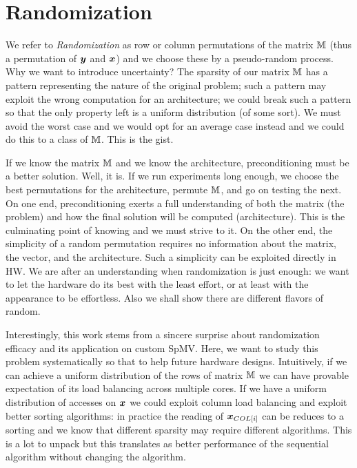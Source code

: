 \documentclass[manuscript,screen]{acmart}
\begin{document}
\section{Randomization}
\label{sec:randomization}
We refer to {\em Randomization} as row or column permutations of the
matrix $\mathbb{M}$ (thus a permutation of ${\boldsymbol y}$ and ${\boldsymbol x}$) and we choose
these by a pseudo-random process. Why we want to introduce
uncertainty? The sparsity of our matrix $\mathbb{M}$ has a pattern
representing the nature of the original problem; such a pattern may
exploit the wrong computation for an architecture; we could break such
a pattern so that the only property left is a uniform distribution (of
some sort). We must avoid the worst case and we would opt for an
average case instead and we could do this to a class of $\mathbb{M}$. This is
the gist.

If we know the matrix $\mathbb{M}$ and we know the architecture,
preconditioning must be a better solution.  Well, it is. If we run
experiments long enough, we choose the best permutations for the
architecture, permute $\mathbb{M}$, and go on testing the next.  On one end,
preconditioning exerts a full understanding of both the matrix (the
problem) and how the final solution will be computed
(architecture). This is the culminating point of knowing and we must
strive to it. On the other end, the simplicity of a random permutation
requires no information about the matrix, the vector, and the
architecture. Such a simplicity can be exploited directly in HW. We
are after an understanding when randomization is just enough: we want
to let the hardware do its best with the least effort, or at least
with the appearance to be effortless. Also we shall show there are
different flavors of random.


Interestingly, this work stems from a sincere surprise about
randomization efficacy and its application on custom SpMV. Here, we
want to study this problem systematically so that to help future
hardware designs. Intuitively, if we can achieve a uniform
distribution of the rows of matrix $\mathbb{M}$ we can have provable
expectation of its load balancing across multiple cores. If we have a
uniform distribution of accesses on ${\boldsymbol x}$ we could exploit column
load balancing and exploit better sorting algorithms: in practice the
reading of ${\boldsymbol x}_{COL[i]}$ can be reduces to a sorting and we know
that different sparsity may require different algorithms. This is a
lot to unpack but this translates as better performance of the
sequential algorithm without changing the algorithm.
\end{document}
